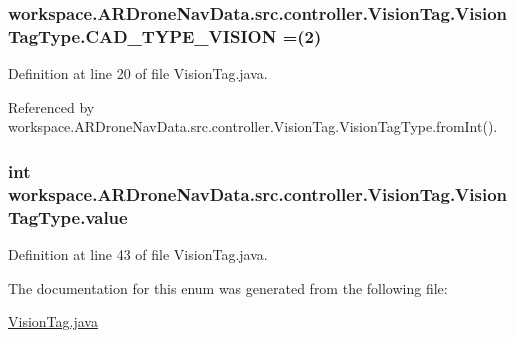 \subsubsection[{C\+A\+D\+\_\+\+T\+Y\+P\+E\+\_\+\+V\+I\+S\+I\+O\+N}]{\setlength{\rightskip}{0pt plus 5cm}workspace.\+A\+R\+Drone\+Nav\+Data.\+src.\+controller.\+Vision\+Tag.\+Vision\+Tag\+Type.\+C\+A\+D\+\_\+\+T\+Y\+P\+E\+\_\+\+V\+I\+S\+I\+O\+N =(2)}\label{enumworkspace_1_1_a_r_drone_nav_data_1_1src_1_1controller_1_1_vision_tag_1_1_vision_tag_type_a6cc20f5039f234ad0d6759fb42610635}


Definition at line 20 of file Vision\+Tag.\+java.



Referenced by workspace.\+A\+R\+Drone\+Nav\+Data.\+src.\+controller.\+Vision\+Tag.\+Vision\+Tag\+Type.\+from\+Int().

\hypertarget{enumworkspace_1_1_a_r_drone_nav_data_1_1src_1_1controller_1_1_vision_tag_1_1_vision_tag_type_a08280d980acea034227041ac8ed51f3b}{}
\subsubsection[{value}]{\setlength{\rightskip}{0pt plus 5cm}int workspace.\+A\+R\+Drone\+Nav\+Data.\+src.\+controller.\+Vision\+Tag.\+Vision\+Tag\+Type.\+value\hspace{0.3cm}{\ttfamily [private]}}\label{enumworkspace_1_1_a_r_drone_nav_data_1_1src_1_1controller_1_1_vision_tag_1_1_vision_tag_type_a08280d980acea034227041ac8ed51f3b}


Definition at line 43 of file Vision\+Tag.\+java.



The documentation for this enum was generated from the following file\+:\begin{DoxyCompactItemize}
\item 
\hyperlink{_vision_tag_8java}{Vision\+Tag.\+java}\end{DoxyCompactItemize}
